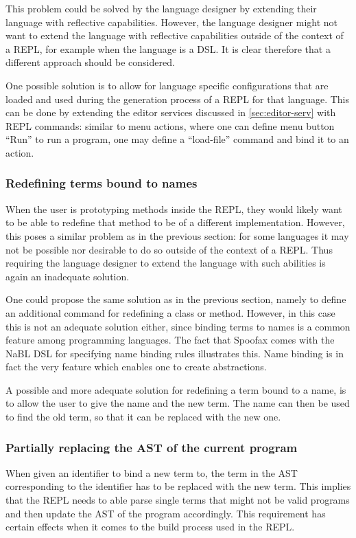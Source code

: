 This problem could be solved by the language designer by extending
their language with reflective capabilities. However, the language
designer might not want to extend the language with reflective
capabilities outside of the context of a REPL, for example when the
language is a DSL. It is clear therefore that a different approach
should be considered.

One possible solution is to allow for language specific configurations
that are loaded and used during the generation process of a REPL for
that language. This can be done by extending the editor services
discussed in \cref{sec:editor-serv} with REPL commands: similar to
menu actions, where one can define menu button ``Run'' to run a
program, one may define a ``load-file'' command and bind it to an
action.

\subsubsection{Redefining terms bound to names}
\label{sec:redef-cont-bound}
When the user is prototyping methods inside the REPL, they would
likely want to be able to redefine that method to be of a different
implementation. However, this poses a similar problem as in the
previous section: for some languages it may not be possible nor
desirable to do so outside of the context of a REPL. Thus requiring
the language designer to extend the language with such abilities is
again an inadequate solution.

One could propose the same solution as in the previous section, namely
to define an additional command for redefining a class or
method. However, in this case this is not an adequate solution either,
since binding terms to names is a common feature among programming
languages. The fact that Spoofax comes with the NaBL DSL for
specifying name binding rules illustrates this. Name binding is in
fact the very feature which enables one to create abstractions.

A possible and more adequate solution for redefining a term bound to a
name, is to allow the user to give the name and the new term. The name
can then be used to find the old term, so that it can be replaced with
the new one.

\subsubsection{Partially replacing the AST of the current program}
When given an identifier to bind a new term to, the term in the AST
corresponding to the identifier has to be replaced with the new term.
This implies that the REPL needs to able parse single terms that might
not be valid programs and then update the AST of the program accordingly.
This requirement has certain effects when it comes to the build process
used in the REPL.

